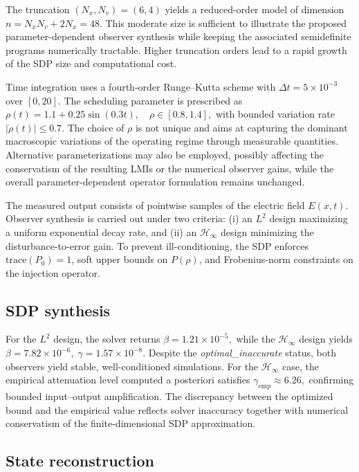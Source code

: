 \documentclass[AMA,Times2COL]{WileyNJDv5}
\begin{document}
The truncation \( (N_x,N_v)=(6,4) \) yields a reduced-order model of dimension
\(
n=N_xN_v+2N_x=48.
\)
This moderate size is sufficient to illustrate the proposed parameter-dependent observer synthesis while keeping the associated semidefinite programs numerically tractable. Higher truncation orders lead to a rapid growth of the SDP size and computational cost.

Time integration uses a fourth-order Runge--Kutta scheme with $\Delta t=5\times10^{-3}$ over $[0,20]$.
The scheduling parameter is prescribed as
\(
\rho(t)=1.1+0.25\sin(0.3t), \quad \rho\in[0.8,1.4],
\)
with bounded variation rate $|\dot\rho(t)|\le 0.7$. The choice of $\rho$ is not unique and aims at capturing the dominant macroscopic variations of the
operating regime through measurable quantities. Alternative parameterizations may also be employed, possibly affecting the conservatism of the resulting LMIs
or the numerical observer gains, while the overall
parameter-dependent operator formulation remains unchanged.

The measured output consists of pointwise samples of the electric field $E(x,t)$. Observer synthesis is carried out under two criteria: (i) an $L^2$ design maximizing a uniform exponential decay rate, and (ii) an
$\mathcal{H}_\infty$ design minimizing the disturbance-to-error gain. To prevent ill-conditioning, the SDP enforces $\mathrm{trace}(P_0)=1$, soft upper bounds on $P(\rho)$, and Frobenius-norm constraints on the injection operator.

\subsection{SDP synthesis}

For the $L^2$ design, the solver returns
\(
\beta=1.21\times10^{-5},
\)
while the $\mathcal{H}_\infty$ design yields
\(
\beta=7.82\times10^{-6},\; \gamma=1.57\times10^{-8}.
\)
Despite the \emph{optimal\_inaccurate} status, both observers yield stable, well-conditioned simulations.
For the $\mathcal{H}_\infty$ case, the empirical attenuation level computed a posteriori satisfies
\(
\gamma_{\mathrm{emp}}\approx6.26,
\)
confirming bounded input--output amplification. The discrepancy between the optimized bound and the empirical value reflects solver inaccuracy together with numerical conservatism of the finite-dimensional SDP approximation.

\subsection{State reconstruction}
\end{document}

